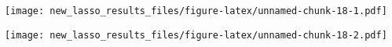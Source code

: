 \documentclass[
]{article}
\newenvironment{Shaded}{\begin{snugshade}}{\end{snugshade}}
\newcommand{\DataTypeTok}[1]{\textcolor[rgb]{0.13,0.29,0.53}{#1}}
\newcommand{\DecValTok}[1]{\textcolor[rgb]{0.00,0.00,0.81}{#1}}
\newcommand{\KeywordTok}[1]{\textcolor[rgb]{0.13,0.29,0.53}{\textbf{#1}}}
\newcommand{\NormalTok}[1]{#1}
\newcommand{\OperatorTok}[1]{\textcolor[rgb]{0.81,0.36,0.00}{\textbf{#1}}}
\newcommand{\StringTok}[1]{\textcolor[rgb]{0.31,0.60,0.02}{#1}}
\begin{document}
\texttt{[image: new\_lasso\_results\_files/figure-latex/unnamed-chunk-18-1.pdf]}

\begin{Shaded}
\end{Shaded}

\texttt{[image: new\_lasso\_results\_files/figure-latex/unnamed-chunk-18-2.pdf]}

\begin{Shaded}
\end{Shaded}
\end{document}
